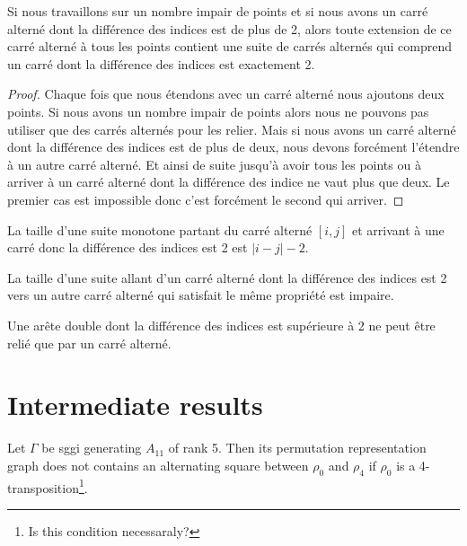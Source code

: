 \begin{corollary}
  Si nous travaillons sur un nombre impair de points et si nous avons un carré alterné dont la différence des indices est de plus de 2, alors toute extension de ce carré alterné à tous les points contient une suite de carrés alternés qui comprend un carré dont la différence des indices est exactement 2.
\end{corollary}

\begin{proof}
  Chaque fois que nous étendons avec un carré alterné nous ajoutons deux points. Si nous avons un nombre impair de points alors nous ne pouvons pas utiliser que des carrés alternés pour les relier. Mais si nous avons un carré alterné dont la différence des indices est de plus de deux, nous devons forcément l'étendre à un autre carré alterné. Et ainsi de suite jusqu'à avoir tous les points ou à arriver à un carré alterné dont la différence des indice ne vaut plus que deux. Le premier cas est impossible donc c'est forcément le second qui arriver.
\end{proof}

\begin{lemma}
  La taille d'une suite monotone partant du carré alterné $[i, j]$ et arrivant à une carré donc la différence des indices est 2 est $|i - j| - 2$.
\end{lemma}

\begin{lemma}
  \label{parity-sequence-squares}
  La taille d'une suite allant d'un carré alterné dont la différence des indices est 2 vers un autre carré alterné qui satisfait le même propriété est impaire.
\end{lemma}

\begin{lemma}
  \label{continue-double-edge}
  Une arête double dont la différence des indices est supérieure à 2 ne peut être relié que par un carré alterné.
\end{lemma}

\section{Intermediate results}

\begin{lemma}
  \label{lemma-forbidden-alternating-square}
  Let $\Gamma$ be sggi generating $A_{11}$ of rank 5. Then its permutation representation graph does not contains an alternating square between $\rho_0$ and $\rho_4$ if $\rho_0$ is a 4-transposition\footnote{Is this condition necessaraly?}.
\end{lemma}

